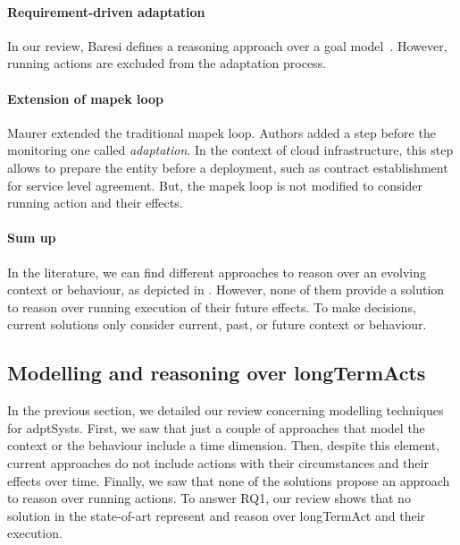 \paragraph{Requirement-driven adaptation}
In our review, Baresi \etal defines a reasoning approach over a goal model~\cite{DBLP:conf/re/BaresiPS10}.
However, running \glspl{action} are excluded from the adaptation process.

\paragraph{Extension of \gls{mapek} loop}
Maurer \etal \cite{DBLP:conf/iscc/MaurerBEB11} extended the traditional \gls{mapek} loop.
Authors added a step before the monitoring one called \textit{adaptation}.
In the context of cloud infrastructure, this step allows to prepare the entity before a deployment, such as contract establishment for service level agreement.
But, the \gls{mapek} loop is not modified to consider running \gls{action} and their effects.

\paragraph{Sum up}

In the literature, we can find different approaches to reason over an evolving context or behaviour, as depicted in .
However, none of them provide a solution to reason over running execution of their future effects.
To make decisions, current solutions only consider current, past, or future context or \gls{behaviour}.

\subsection[Modelling and reasoning over long-term actions]{Modelling and reasoning over \glspl{longTermAct}}
In the previous section, we detailed our review concerning modelling techniques for \glspl{adptSyst}.
First, we saw that just a couple of approaches that model the context or the \gls{behaviour} include a time dimension.
Then, despite this element, current approaches do not include \glspl{action} with their circumstances and their effects over time.
Finally, we saw that none of the solutions propose an approach to reason over running actions.
To answer RQ1, our review shows that no solution in the state-of-art represent and reason over \gls{longTermAct} and their execution.












